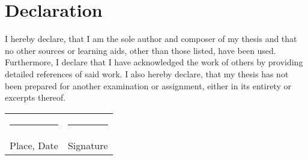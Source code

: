 
\chapter*{Declaration}

I hereby declare, that I am the sole author and composer of my thesis and that no other sources or learning aids, other than those listed, have been used. Furthermore, I declare that I have acknowledged the work of others by providing detailed references of said work.  \newline
I also hereby declare, that my thesis has not been prepared for another examination
or assignment, either in its entirety or excerpts thereof.
\\[3\normalbaselineskip]
\begin{tabular}{p{} l}
  \rule{\textwidth/3}{0.4pt}   &   \rule{\textwidth/3}{0.4pt} \\
  Place, Date                  &   Signature
\end{tabular}
